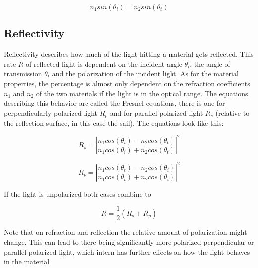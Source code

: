 \documentclass[14pt]{article}
\begin{document}
\begin{equation}
  n_1 sin(\theta_i) = n_2 sin(\theta_t)
  \label{eq:snell}
\end{equation}

\subsection{Reflectivity}

Reflectivity describes how much of the light hitting a material gets reflected.  This rate $R$ of reflected light is dependent on the incident angle $\theta_i$,
the angle of transmission $\theta_t$ and the polarization of
the incident light\autocite{Hecht2016-pd}. As for the material properties, the percentage is almost only dependent on the refraction coefficients
$n_1$ and $n_2$ of the two materials if the light is in the optical range\autocite{hoffman_driggers_2016}. The equations describing this behavior are called
the Fresnel equations, there is one for perpendicularly polarized light $R_p$ and for parallel polarized light $R_s$ (relative to the reflection surface, in this case the sail).
The equations look like this:

$$
R_s = \left| \frac{n_1 cos(\theta_i) - n_2 cos(\theta_t)}{n_1 cos(\theta_i) + n_2 cos(\theta_t)} \right|^2
$$

$$
R_p = \left| \frac{n_1 cos(\theta_t) - n_2 cos(\theta_i)}{n_1 cos(\theta_t) + n_2 cos(\theta_i)} \right|^2
$$

If the light is unpolarized both cases combine to

\begin{equation}
R = \frac{1}{2} (R_s+R_p)
\label{eq:reflecticity_unpolarized}
\end{equation}


Note that on refraction and reflection the relative amount of polarization might change. This can lead
to there being significantly more polarized perpendicular or parallel polarized light, which intern
has further effects on how the light behaves in the material
\end{document}
